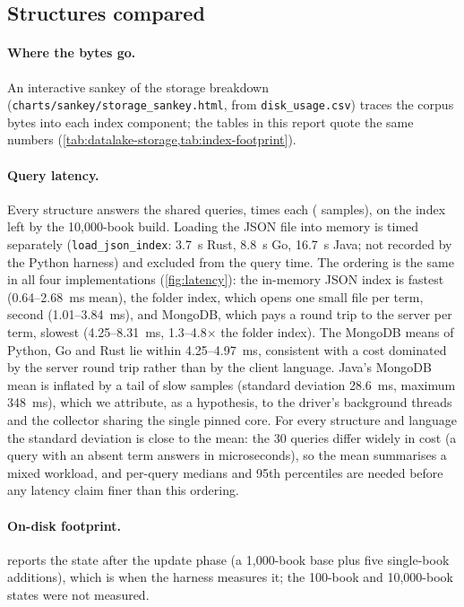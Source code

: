 \subsection{Structures compared}
\label{sec:index-structures}

\paragraph{Where the bytes go.}
An interactive sankey of the storage breakdown
(\texttt{charts/sankey/\allowbreak storage\_\allowbreak sankey.html}, from
\texttt{disk\_usage.csv}) traces the corpus bytes into each index
component; the tables in this report quote the same numbers
(\cref{tab:datalake-storage,tab:index-footprint}).

\paragraph{Query latency.}
Every structure answers the  shared queries,  times each
( samples), on the index left by the 10{,}000-book build. Loading
the JSON file into memory is timed separately (\texttt{load\_json\_index}:
3.7~s Rust, 8.8~s Go, 16.7~s Java; not recorded by the Python harness) and
excluded from the query time. The ordering is the same in all four
implementations (\cref{fig:latency}): the in-memory JSON index is fastest
(0.64--2.68~ms mean), the folder index, which opens one small file per term,
second (1.01--3.84~ms), and MongoDB, which pays a round trip to the server
per term, slowest (4.25--8.31~ms, 1.3--4.8$\times$ the folder index). The
MongoDB means of Python, Go and Rust lie within 4.25--4.97~ms, consistent
with a cost dominated by the server round trip rather than by the client
language. Java's MongoDB mean is inflated by a tail of slow samples
(standard deviation 28.6~ms, maximum 348~ms), which we attribute, as a
hypothesis, to the driver's background threads and the collector sharing the
single pinned core. For every structure and language the standard deviation
is close to the mean: the 30 queries differ widely in cost (a query with an
absent term answers in microseconds), so the mean summarises a mixed
workload, and per-query medians and 95th percentiles are needed before any
latency claim finer than this ordering.

\paragraph{On-disk footprint.}
 reports the state after the update phase (a
1{,}000-book base plus five single-book additions), which is when the harness
measures it; the 100-book and 10{,}000-book states were not measured.


